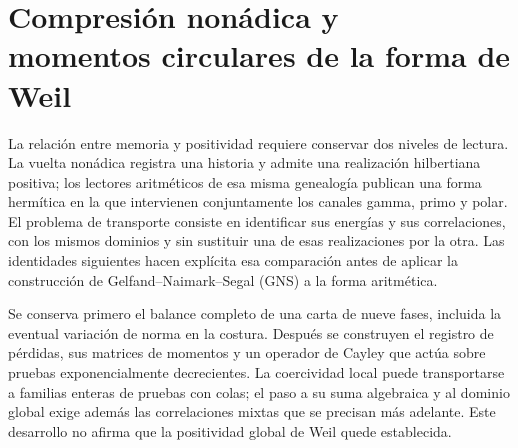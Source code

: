 \clearpage
\section[Compresión nonádica y momentos circulares de la forma de Weil]{Compresión nonádica y\\momentos circulares de la forma de Weil}
\label{sec:transporte-momentos}
\label{tm-add-seccion}

La relación entre memoria y positividad requiere conservar dos niveles de lectura.
La vuelta nonádica registra una historia y admite una realización hilbertiana
positiva; los lectores aritméticos de esa misma genealogía publican una forma
hermítica en la que intervienen conjuntamente los canales gamma, primo y polar.
El problema de transporte consiste en identificar sus energías y sus correlaciones,
con los mismos dominios y sin sustituir una de esas realizaciones por la otra.
Las identidades siguientes hacen explícita esa comparación antes de aplicar
la construcción de Gelfand--Naimark--Segal (GNS) a la forma aritmética.

Se conserva primero el balance completo de una carta de nueve fases, incluida
la eventual variación de norma en la costura. Después se construyen el registro
de pérdidas, sus matrices de momentos y un operador de Cayley que actúa sobre
pruebas exponencialmente decrecientes. La coercividad local puede transportarse
a familias enteras de pruebas con colas; el paso a su suma algebraica y al dominio
global exige además las correlaciones mixtas que se precisan más adelante.
Este desarrollo no afirma que la positividad global de Weil quede establecida.

% 
% 
% 
% 

